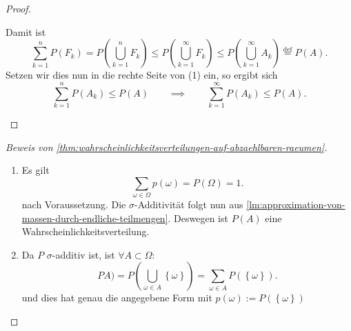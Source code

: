 \begin{proof}
\begin{enumerate}[label=\protect\circled{\alph*}]
\begin{enumerate}[1)]
\begin{equation}
                    \end{equation}
                    Damit ist
                    \[
                        \sum_{k=1}^n P(F_k) = P\left( \bigcup_{k=1}^n F_k \right) \leq P\left( \bigcup_{k=1}^{\infty}F_k \right) \leq P\left( \bigcup_{k=1}^{\infty}A_k \right)  \stackrel{\text{def}}{=} P(A)
                    .\] 
                    Setzen wir dies nun in die rechte Seite von (1) ein, so ergibt sich
                    \[
                        \sum_{k=1}^n P(A_k) \leq  P(A) \qquad \implies \qquad \sum_{k=1}^{\infty} P(A_k) \leq  P(A)
                    .\] 
            \end{enumerate}
    \end{enumerate}
\end{proof}
\begin{proof}[Beweis von \autoref{thm:wahrscheinlichkeitsverteilungen-auf-abzaehlbaren-raeumen}]
    \begin{enumerate}[label=\protect\circled{\alph*}]
        \item Es gilt
            \[
                \sum_{\omega\in \Omega}p(\omega) = P(\Omega) = 1
            .\] 
            nach Voraussetzung. Die $\sigma$-Additivität folgt nun aus \autoref{lm:approximation-von-massen-durch-endliche-teilmengen}. Deswegen ist $P(A)$ eine Wahrscheinlichkeitsverteilung.
        \item Da $P$ $\sigma$-additiv ist, ist $\forall A \subset \Omega$:
            \[
                PA) = P\left(\bigcup_{\omega\in A} \left \{\omega\right\} \right) = \sum_{\omega\in A} P(\left \{\omega\right\} )
            .\] 
            und dies hat genau die angegebene Form mit $p(\omega) := P(\left \{\omega\right\} )$
    \end{enumerate}
\end{proof}


